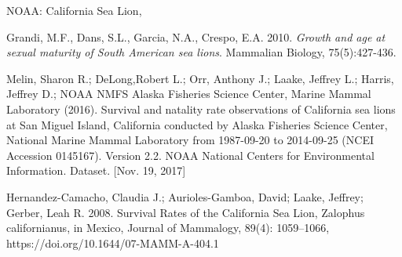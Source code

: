 \documentclass[12pt, a4paper]{article}
\begin{document}
% 

\begin{thebibliography}{99}

NOAA: California Sea Lion, \\

Grandi, M.F., Dans, S.L., Garcia, N.A., Crespo, E.A. 2010. \emph{Growth and age at sexual maturity of South American sea lions}. Mammalian Biology, 75(5):427-436.   

Melin, Sharon R.; DeLong,Robert L.; Orr, Anthony J.; Laake, Jeffrey L.; Harris, Jeffrey D.; NOAA NMFS Alaska Fisheries Science Center, Marine Mammal Laboratory (2016). Survival and natality rate observations of California sea lions at San Miguel Island, California conducted by Alaska Fisheries Science Center, National Marine Mammal Laboratory from 1987-09-20 to 2014-09-25 (NCEI Accession 0145167). Version 2.2. NOAA National Centers for Environmental Information. Dataset. [Nov. 19, 2017]

Hernandez-Camacho, Claudia J.; Aurioles-Gamboa, David; Laake, Jeffrey; Gerber, Leah R. 2008. Survival Rates of the California Sea Lion, Zalophus californianus, in Mexico, Journal of Mammalogy, 89(4): 1059–1066, https://doi.org/10.1644/07-MAMM-A-404.1


\end{thebibliography}
\end{document}
